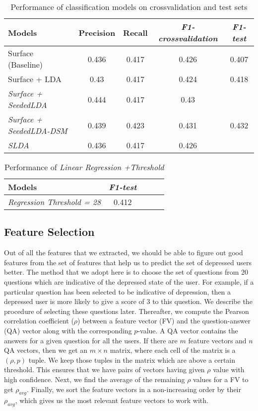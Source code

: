 \begin{table} [ht!]
\begin{tabular}{lcccc}
\toprule
Models & Precision & Recall & \textit{F1-crossvalidation} & \textit{F1-test}  \\
\midrule
Surface (Baseline) & 0.436 & 0.417 & 0.426 &  0.407\\
Surface + LDA & 0.43 & 0.417 & 0.424 &  0.418 \\
\textit{Surface + SeededLDA} &  0.444&  0.417& 0.43 &  \\
\textit{Surface + SeededLDA-{DSM}} & 0.439 & 0.423 & 0.431 & 0.432 \\
\textit{SLDA } & 0.436 & 0.417 & 0.426 &  \\
\bottomrule
\end{tabular}
\caption{Performance of classification models on crossvalidation and test sets}
\label{table:results_1}

\end{table}
\begin{table} [ht!]
\begin{tabular}{lcccc}
\toprule
Models & \textit{F1-test}  \\
\midrule
\textit{Regression Threshold = 28 } & 0.412 \\
\bottomrule
\end{tabular}
\caption{Performance of \textit{Linear Regression +Threshold}}
\label{table:results_2}
\end{table}

 
\subsection{Feature Selection}
\label{sec:featuresel}
Out of all the features that we extracted, we should be able to figure out good features from the set of features that help us to predict the set of depressed users better. The method that we adopt here is to choose the set of questions from 20 questions which are indicative of the depressed state of the user. For example, if a particular question has been selected to be indicative of depression, then a depressed user is more likely to give a score of 3 to this question. We describe the procedure of selecting these questions later. Thereafter, we compute the Pearson correlation coefficient ($\rho$) between a feature vector (FV) and the question-answer (QA) vector along with the corresponding $p$-value. A QA vector contains the answers for a given question for all the users. If there are $m$ feature vectors and $n$ QA vectors, then we get an $m\times n$ matrix, where each cell of the matrix is a $(\rho, p)$ tuple. We keep those tuples in the matrix which are above a certain threshold. This ensures that we have pairs of vectors having given $\rho$ value with high confidence. Next, we find the average of the remaining $\rho$ values for a FV to get $\rho_{avg}$. Finally, we sort the feature vectors in a non-increasing order by their $\rho_{avg}$, which gives us the most relevant feature vectors to work with.

